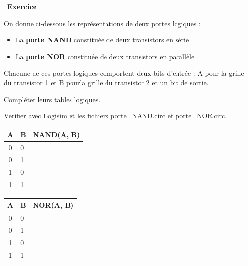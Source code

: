 \documentclass[
  11pt,
]{article}
\providecommand{\tightlist}{%
  \setlength{\itemsep}{0pt}\setlength{\parskip}{0pt}}
\newcounter{exo}
\newenvironment{exercice}[1]
{\par \medskip   \addtocounter{exo}{1} \noindent  
\begin{bclogo}[arrondi =0.1,   noborder = true, logo=\bccrayon, marge=4]{~\textbf{Exercice} \textbf{\theexo} {\itshape #1} }  \par}
{
\end{bclogo}
 \par \bigskip }
\newcounter{logi}
\begin{document}
\begin{exercice}{}

On donne ci-dessous les représentations de deux portes logiques :

\begin{itemize}
\tightlist
\item
  La \textbf{porte NAND} constituée de deux transistors en série
\item
  La \textbf{porte NOR} constituée de deux transistors en parallèle
\end{itemize}

Chacune de ces portes logiques comportent deux bits d'entrée : A pour la
grille du transistor 1 et B pourla grille du transistor 2 et un bit de
sortie.

Compléter leurs tables logiques.

Vérifier avec \href{http://www.cburch.com/logisim/}{Logisim} et les
fichiers \href{circuits_logisim/porte_NAND.circ}{porte\_NAND.circ} et
\href{circuits_logisim/porte_NOR.circ}{porte\_NOR.circ}.

\begin{longtable}[]{@{}cll@{}}
\toprule
A & B & NAND(A, B)\tabularnewline
\midrule
\endhead
0 & 0 &\tabularnewline
0 & 1 &\tabularnewline
1 & 0 &\tabularnewline
1 & 1 &\tabularnewline
\bottomrule
\end{longtable}

\begin{longtable}[]{@{}cll@{}}
\toprule
A & B & NOR(A, B)\tabularnewline
\midrule
\endhead
0 & 0 &\tabularnewline
0 & 1 &\tabularnewline
1 & 0 &\tabularnewline
1 & 1 &\tabularnewline
\bottomrule
\end{longtable}

\end{exercice}
\end{document}
